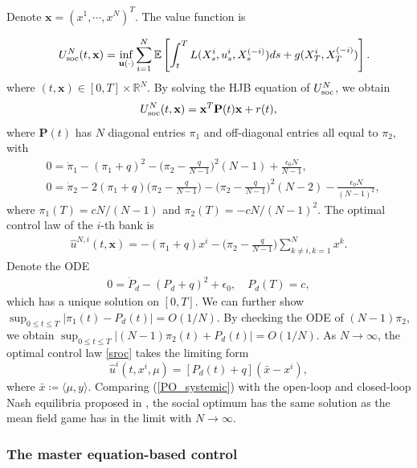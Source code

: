 \documentclass{amsart}
\theoremstyle{definition}
\theoremstyle{remark}
\def\EE{{\mathbb E}}
\numberwithin{equation}{section}
\begin{document}
Denote
${\mathbf x}=(x^1,\cdots , x^N)^T$. The value function   is


\begin{eqnarray}
\nonumber&&U^N_{\rm soc }(t,{\mathbf x})=\inf_{{\mathbf u(\cdot)}}\sum_{i=1}^N\EE\left[\int_t^T L( X^{i}_s ,u^i_s ,  X_s^{(-i)})ds+g(X^{i}_T,X_T^{(-i)})\right].
\end{eqnarray}
where $(t,{\mathbf x})\in [0,T]\times{\mathbb R}^N$.
By solving the HJB equation of $U_{\rm soc}^N$, we obtain
\begin{align}
U^N_{\rm soc }(t,{\mathbf x})={\mathbf  x}^T {\mathbf P}(t) {\mathbf x} + r(t), \notag
\end{align}
where ${\mathbf P}(t)$ has $N$ diagonal entries $\pi_1$ and off-diagonal entries  all equal to $\pi_2$, with
 \begin{align*}
 &0=\dot \pi_1 - (\pi_1+q)^2  -\Big(\pi_2 -\frac{q}{N-1}\Big)^2(N-1) + \frac{\epsilon_0 N}{N-1},\\
&0=\dot \pi_2 - 2(\pi_1 +q)\Big(\pi_2-\frac{q}{N-1}\Big) -\Big(\pi_2-\frac{q}{N-1}\Big)^2(N-2)- \frac{\epsilon_0 N}{(N-1)^2} ,
 \end{align*}
 where $\pi_1(T)= cN/(N-1)$ and $\pi_2(T)=-cN/(N-1)^2$.
The optimal control law of the $i$-th bank is
\begin{align}\label{sroc}
\hat u^{N,i}(t, {\mathbf x})=- (\pi_1+q) x^i -\Big(\pi_2  - \frac{q}{N-1} \Big)\sum_{k\ne i, k=1}^N x^k.
\end{align}
Denote the ODE
\begin{align}
0=\dot P_d -(P_d+q)^2+\epsilon_0, \quad P_d(T)= c,
\end{align}
which has a unique solution on $[0,T]$. We can further show $\sup_{0\le t\le T}|\pi_1(t)-P_d(t)|=O(1/N)$. By checking the  ODE of $(N-1) \pi_2$, we obtain  $\sup_{0\le t\le T}|(N-1)\pi_2(t)+P_d(t)|=O(1/N)$.
As $N\to \infty$, the optimal control law \eqref{sroc} takes the limiting form
\begin{equation}\label{PO_systemic}
\hat u^i(t,x^i,\mu)=[P_d(t)+q](\bar x-x^i),
\end{equation}
where $\bar x\coloneqq \langle \mu, y \rangle$.
Comparing (\ref{PO_systemic}) with the open-loop and closed-loop Nash equilibria proposed in \cite{CFS15}, the social optimum has the same solution as the mean field game has in the limit with $N\rightarrow\infty$.




\subsubsection{The master equation-based control }
\end{document}
